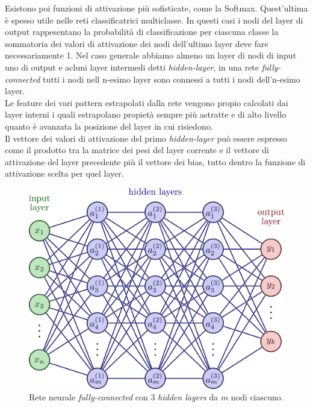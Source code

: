 \documentclass[12pt,a4paper,openright,twoside]{report}
\begin{document}
Esistono poi funzioni di attivazione più sofisticate, come la Softmax.
Quest'ultima è spesso utile nelle reti classificatrici multiclasse. In questi casi i nodi del layer di output rappesentano la probabilità di classificazione per ciascuna classe la sommatoria dei valori di attivazione dei nodi dell'ultimo layer deve fare necessariamente 1.
\newpage
Nel caso generale abbiamo almeno un layer di nodi di input uno di output e acluni layer intermedi detti \emph{hidden-layer},
in una rete \emph{fully-connected} tutti i nodi nell n-esimo layer sono connessi a tutti i nodi dell'n-esimo layer. \\
Le feature dei vari pattern estrapolati dalla rete vengono propio calcolati dai layer interni i quali estrapolano propietà sempre più astratte e di alto livello quanto è avanzata la posizione del layer in cui risiedono. \\
Il vettore dei valori di attivazione del primo \emph{hidden-layer} può essere espresso come il prodotto tra la matrice dei pesi del layer corrente e il vettore di attivazione del layer precedente più il vettore dei bias, tutto dentro la funzione di attivazione scelta per quel layer.

\begin{figure}[h]
\centering
\includegraphics[width=\linewidth]{neural_networks-004.png}
\caption{Rete neurale \emph{fully-connected} con $3$ \emph{hidden layers} da $m$ nodi ciascuno.}
\end{figure}
\end{document}

